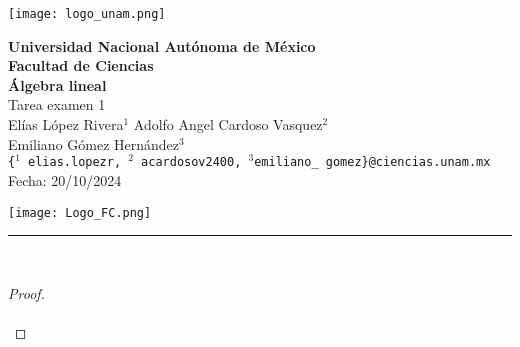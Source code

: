 \documentclass[11pt,letterpaper]{article}
\begin{document}

\begin{center}
    \begin{minipage}{3cm}
    	\begin{center}
    		\texttt{[image: logo\_unam.png]}
    	\end{center}
    \end{minipage}\hfill
    \begin{minipage}{10cm}
    	\begin{center}
    	\textbf{\large Universidad Nacional Autónoma de México}\\[0.1cm]
        \textbf{Facultad de Ciencias}\\[0.1cm]
        \textbf{\'Algebra lineal}\\[0.1cm]
        Tarea examen 1 \\[0.1cm]
         El\'ias L\'opez Rivera$^{1}$\,\,Adolfo Angel Cardoso Vasquez$^{2}$\\[0.1cm]
		Emiliano G\'omez Hern\'andez$^{3}$\\[0.1cm]
        \texttt{\{$^{1}$ elias.lopezr,\,${^2}$ acardosov2400,\,$^{3}$emiliano\_ gomez\}@ciencias.unam.mx }\\[0.1cm]
        Fecha:\,\,20/10/2024
    	\end{center}
    \end{minipage}\hfill
    \begin{minipage}{3cm}
    	\begin{center}
    		\texttt{[image: Logo\_FC.png]}
    	\end{center}
    \end{minipage}
\end{center}

\rule{17cm}{0.1mm}

\,\\
\begin{proof}\,\\
    \,\\
\end{proof}
\end{document}
